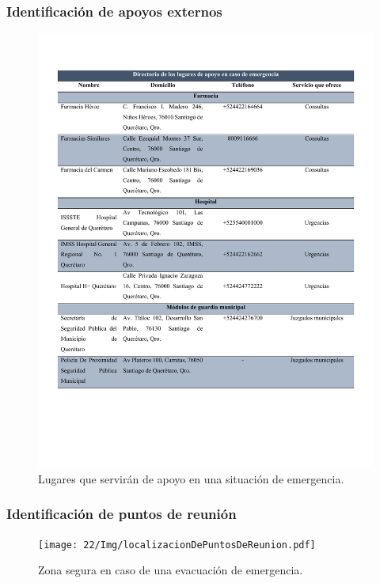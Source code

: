     \subsubsection{Identificación de apoyos externos}
    \begin{figure}[H]
        \centering
        \includegraphics[trim = {1mm 45mm 10mm 15mm},clip,scale=0.4]{22/Img/apoyosExt.pdf}
        \caption{ Lugares que servirán de apoyo en una situación de emergencia.}
        \label{fig:apoyosExt}
    \end{figure}
    
    \subsubsection{Identificación de puntos de reunión}
    
    
    \begin{figure}[H]
        \centering
         \texttt{[image: 22/Img/localizacionDePuntosDeReunion.pdf]}
        \caption{Zona segura en caso de una evacuación de emergencia.}
        \label{fig:puntosDeReunión}
    \end{figure}
    
